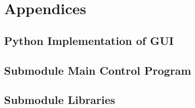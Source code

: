 \documentclass{report}
\begin{document}



\newpage
\chapter{Appendices}
\section{Python Implementation of GUI}


\newpage
\section{Submodule Main Control Program}


\newpage
\section{Submodule Libraries}


\newpage


\newpage


\end{document}
